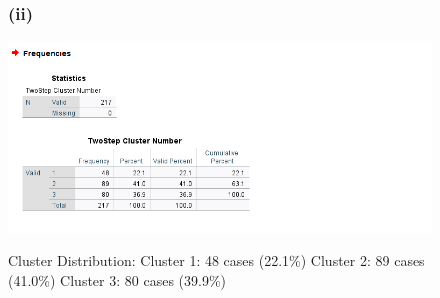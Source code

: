 \documentclass[english,10pt,a4paper]{article}
\begin{document}
\begin{figure}[h]
	\subsubsection*{(ii)}
	
		\includegraphics[width=1.5\linewidth]{cluster distribution of the cases1}
		
	Cluster Distribution: \newline
	Cluster 1: 48 cases (22.1\%) \newline
	Cluster 2: 89 cases (41.0\%) \newline
	Cluster 3: 80 cases (39.9\%) \newline
	\end{figure}
	 
			
		
	
\end{document}
